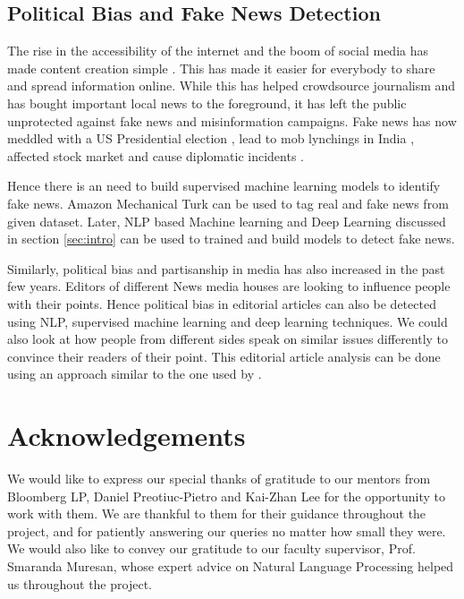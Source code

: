 \documentclass[11pt]{article}
\begin{document}
\subsection{Political Bias and Fake News Detection}

The rise in the accessibility of the internet and the boom of social media has made content creation simple \cite{baly2018predicting}. This has made it easier for everybody to share and spread information online. While this has helped crowdsource journalism and has bought important local news to the foreground, it has left the public unprotected against fake news and misinformation campaigns. Fake news has now meddled with a US Presidential election \cite{allcott2017social}, lead to mob lynchings in India \cite{arun2019whatsapp, bali2019fake}, affected stock market \cite{gingerich_2019} and cause diplomatic incidents \cite{aljazeera_2018, filho_2018}.

Hence there is an need to build supervised machine learning models to identify fake news. Amazon Mechanical Turk can be used to tag real and fake news from given dataset. Later, NLP based Machine learning and Deep Learning discussed in section \ref{sec:intro} can be used to trained and build models to detect fake news.

Similarly, political bias and partisanship in media has also increased in the past few years. Editors of different News media houses are looking to influence people with their points. Hence political bias in editorial articles can also be detected using NLP, supervised machine learning and deep learning techniques. We could also look at how people from different sides speak on similar issues differently to convince their readers of their point. This editorial article analysis can be done using an approach similar to the one used by . 

\section*{Acknowledgements}

We would like to express our special thanks of gratitude to our mentors from Bloomberg LP, Daniel Preotiuc-Pietro and Kai-Zhan Lee for the opportunity to work with them. We are thankful to them for their guidance throughout the project, and for patiently answering our queries no matter how small they were. We would also like to convey our gratitude to our faculty supervisor, Prof. Smaranda Muresan, whose expert advice on Natural Language Processing helped us throughout the project. 
\end{document}
